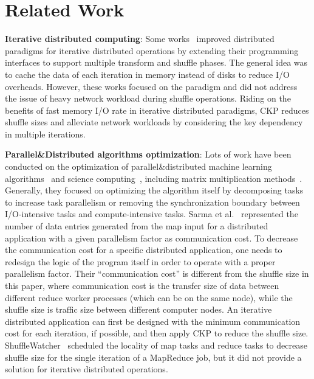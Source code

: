 \documentclass[10pt,journal,compsoc]{IEEEtran}
\begin{document}
\section{Related Work}\label{section:relatedWork}
\textbf{Iterative distributed computing}: 
Some works~\cite{gunarathne2013scalable,
zaharia2012resilient,bu2010haloop, ekanayake2010twister} improved
distributed paradigms for iterative distributed operations by extending
their programming interfaces to support multiple transform and shuffle
phases.
The general idea was to cache the data of each iteration in memory
instead of disks to reduce I/O overheads.
However, these works focused on the paradigm and did not address the
issue of heavy network workload during shuffle operations.
Riding on the benefits of fast memory I/O rate in iterative distributed
paradigms, CKP reduces shuffle sizes and alleviate network workloads by
considering the key dependency in multiple iterations.

\textbf{Parallel\&Distributed algorithms optimization}: Lots of work
have been conducted on the optimization of parallel\&distributed machine
learning algorithms~\cite{bekkerman2011scaling} and science
computing~\cite{kiran2013verification, mensink2012metric}, including
matrix multiplication methods~\cite{buluc2012parallel,
ballard2012communication}.
Generally, they focused on optimizing the algorithm itself by
decomposing tasks to increase task parallelism or removing the
synchronization boundary between I/O-intensive tasks and
compute-intensive tasks.
Sarma et al.~\cite{Sarma:2013:ULB} represented the number of data
entries generated from the map input for a distributed application with
a given parallelism factor as communication cost.
To decrease the communication cost for a specific distributed
application, one needs to redesign the logic of the program itself in
order to operate with a proper parallelism factor.
Their ``communication cost'' is different from the shuffle size in
this paper, where communication cost is the transfer size of data
between different reduce worker processes (which can be on the same
node), while the shuffle size is traffic size between different computer
nodes.
An iterative distributed application can first be designed with the
minimum communication cost for each iteration, if possible, and then
apply CKP to reduce the shuffle size.
ShuffleWatcher~\cite{faraz2014shufflewatcher} scheduled the locality of
map tasks and reduce tasks to decrease shuffle size for the single
iteration of a MapReduce job, but it did not provide a solution for
iterative distributed operations.
\end{document}
